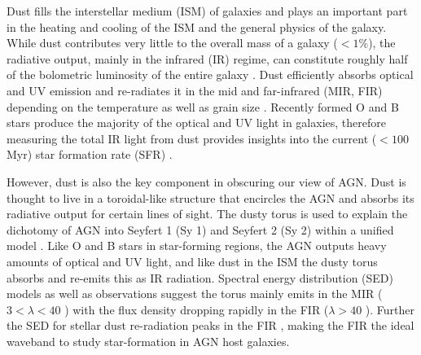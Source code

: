 Dust fills the interstellar medium (ISM) of galaxies and plays an important part in the heating and cooling of the ISM and the general physics of the galaxy. While dust contributes very little to the overall mass of a galaxy ($<1\%$), the radiative output, mainly in the infrared (IR) regime, can constitute roughly half of the bolometric luminosity of the entire galaxy \citep{Hauser_2001,Boselli_2003,Dale:2007fk,Burgarella_2013}. Dust efficiently absorbs optical and UV emission and re-radiates it in the mid and far-infrared (MIR, FIR) depending on the temperature as well as grain size \citep{Draine:2003gd}. Recently formed O and B stars produce the majority of the optical and UV light in galaxies, therefore measuring the total IR light from dust provides insights into the current ($<100$ Myr) star formation rate (SFR) \citep[e.g.][]{Kennicutt:2012it}.

However, dust is also the key component in obscuring our view of AGN. Dust is thought to live in a toroidal-like structure that encircles the AGN and absorbs its radiative output for certain lines of sight. The dusty torus is used to explain the dichotomy of AGN into Seyfert 1 (Sy 1) and Seyfert 2 (Sy 2) within a unified model \citep{Antonucci:1993os,Urry:1995il}. Like O and B stars in star-forming regions, the AGN outputs heavy amounts of optical and UV light, and like dust in the ISM the dusty torus absorbs and re-emits this as IR radiation. Spectral energy distribution (SED) models \citep{Barvainis:1987ty,Pier:1992sf,Efstathiou:1995rz,Nenkova:2002ys,Fritz:2006yq}  as well as observations \citep{Elvis:1994uq,Spinoglio:2002uq,Netzer:2007ve,Mullaney:2011yq,Mor:2012fj} suggest the torus mainly emits in the MIR ($3<\lambda<40$ \um) with the flux density dropping rapidly in the FIR ($\lambda>40$ \um). Further the SED for stellar dust re-radiation peaks in the FIR \citep{Calzetti:2000fk,Dale:2002ty,Draine:2007rm}, making the FIR the ideal waveband to study star-formation in AGN host galaxies.

